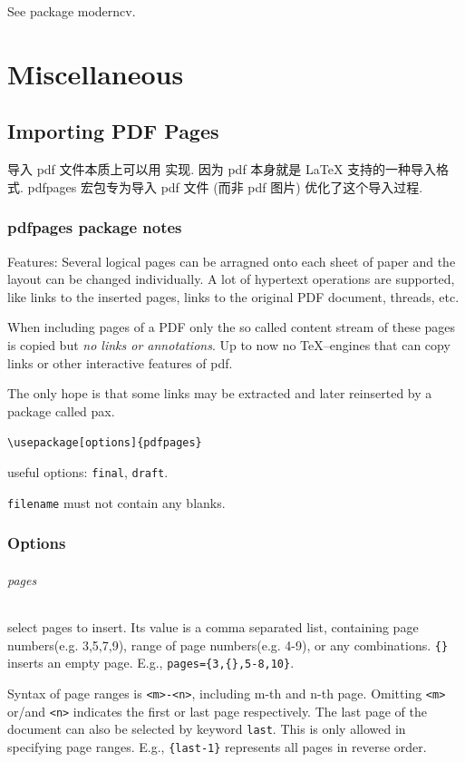 \documentclass[a4paper,oneside]{book}
\newcommand{\package}[1]{\textsf{#1}}
\newcommand{\syntax}[1]{\PVerb{#1}}
\begin{document}
See package \package{moderncv}.

\part{Miscellaneous}
\chapter{Importing PDF Pages}
导入 pdf 文件本质上可以用 \syntax{\includegraphics} 实现. 因为 pdf 本身就是 \LaTeX{} 支持的一种导入格式. \package{pdfpages} 宏包专为导入 pdf 文件 (而非 pdf 图片) 优化了这个导入过程.
\section{\textsf{pdfpages} package notes}

Features:
Several logical pages can be arragned onto each sheet of paper and the layout can be changed individually. A lot of hypertext operations are supported, like links to the inserted pages, links to the original PDF document, threads, etc.

When including pages of a PDF only the so called content stream of these pages is copied but \emph{no links or annotations}. Up to now no TeX--engines that can copy links or other interactive features of pdf. 

The only hope is that some links may be extracted and later reinserted by a package called \textsf{pax}.

\noindent\verb|\usepackage[options]{pdfpages}|

useful options: \verb|final|, \verb|draft|.

\noindent\verb||

\verb|filename| must not contain any blanks.

\section*{Options}
\paragraph{pages}
select pages to insert. Its value is a comma separated list, containing page numbers(e.g. {3,5,7,9}), range of page numbers(e.g. {4-9}), or any combinations. \verb|{}| inserts an empty page. E.g., \verb|pages={3,{},5-8,10}|.

Syntax of page ranges is \verb|<m>-<n>|, including m-th and n-th page. Omitting \verb|<m>| or/and \verb|<n>| indicates the first or last page respectively. The last page of the document can also be selected by keyword \verb|last|. This is only allowed in specifying page ranges. E.g., \verb|{last-1}| represents all pages in reverse order.
\end{document}
